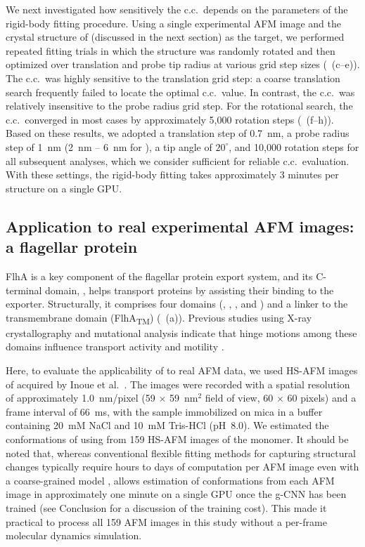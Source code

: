 We next investigated how sensitively the c.c.\ depends on the parameters of the rigid-body fitting procedure. 
Using a single experimental AFM image and the crystal structure of \flhac (discussed in the next section) as the target, we performed repeated fitting trials in which the structure was randomly rotated and then optimized over translation and probe tip radius at various grid step sizes (~(c--e)). 
The c.c.\ was highly sensitive to the translation grid step: a coarse translation search frequently failed to locate the optimal c.c.\ value. 
In contrast, the c.c.\ was relatively insensitive to the probe radius grid step. 
For the rotational search, the c.c.\ converged in most cases by approximately 5,000 rotation steps (~(f--h)). 
Based on these results, we adopted a translation step of 0.7~nm, a probe radius step of 1~nm (2~nm -- 6~nm for \flhac), a tip angle of $20^{\circ}$, and 10,000 rotation steps for all subsequent analyses, which we consider sufficient for reliable c.c.\ evaluation.
With these settings, the rigid-body fitting takes approximately 3 minutes per structure on a single GPU.

\subsection{Application to real experimental AFM images: a flagellar protein \flhac}

FlhA is a key component of the flagellar protein export system, and its C-terminal domain, \flhac, helps transport proteins by assisting their binding to the exporter. 
Structurally, it comprises four domains (\acdi, \acdii, \acdiii, and \acdiv) and a linker to the transmembrane domain (FlhA\textsubscript{TM}) (~(a)).
Previous studies using X-ray crystallography and mutational analysis indicate that hinge motions among these domains influence transport activity and motility \cite{saijo-hamano2010flha}. 

Here, to evaluate the applicability of \Model to real AFM data, we used HS-AFM images of \flhac acquired by Inoue et al.\ \cite{inoue_structural_2019}.
The images were recorded with a spatial resolution of approximately 1.0~nm/pixel (59 $\times$ 59~nm$^2$ field of view, 60 $\times$ 60 pixels) and a frame interval of 66~ms, with the sample immobilized on mica in a buffer containing 20~mM NaCl and 10~mM Tris-HCl (pH~8.0).
We estimated the conformations of \flhac using \Model from 159 HS-AFM images of the \flhac monomer.
It should be noted that, whereas conventional flexible fitting methods for capturing structural changes typically require hours to days of computation per AFM image even with a coarse-grained model \cite{Niina2020},
\Model allows estimation of conformations from each AFM image in approximately one minute on a single GPU once the g-CNN has been trained (see Conclusion for a discussion of the training cost).
This made it practical to process all 159 AFM images in this study without a per-frame molecular dynamics simulation.

